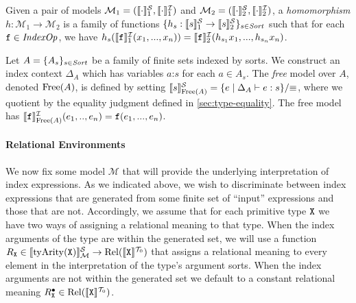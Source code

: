 Given a pair of models $\mathcal{M}_1 = (\llbracket \cdot \rrbracket^{\mathcal{S}}_1,
\llbracket \cdot \rrbracket^{\mathcal{I}}_1)$ and $\mathcal{M}_2 = (\llbracket \cdot \rrbracket^{\mathcal{S}}_2,
\llbracket \cdot \rrbracket^{\mathcal{I}}_2)$, a \emph{homomorphism} $h : \mathcal{M}_1 \to
\mathcal{M}_2$ is a family of functions $\{ h_s : \llbracket s \rrbracket^{\mathcal{S}}_1 \to
\llbracket s \rrbracket^{\mathcal{S}}_2 \}_{s \in \mathit{Sort}}$ such that for each $\texttt{f} \in
\mathit{IndexOp}$, we have $h_s(\llbracket \texttt{f} \rrbracket^{\mathcal{I}}_1 (x_1,...,x_n)) =
\llbracket \texttt{f} \rrbracket^{\mathcal{I}}_2(h_{s_1}x_1, ..., h_{s_n}x_n)$.

Let $A = \{ A_s \}_{s \in \mathit{Sort}}$ be a family of finite sets
indexed by sorts. We construct an index context $\Delta_A$ which has
variables $a\mathord:s$ for each $a \in A_s$. The \emph{free} model
over $A$, denoted $\mathrm{Free}(A)$, is defined by setting
$\llbracket s \rrbracket^{\mathcal{S}}_{\mathrm{Free}(A)} = \{e \mathrel| \Delta_A \vdash e :
s\}/\mathord\equiv$, where we quotient by the equality judgment
defined in \autoref{sec:type-equality}. The free model has
$\llbracket \texttt{f} \rrbracket^{\mathcal{I}}_{\mathrm{Free}(A)}(e_1,..,e_n) =
\texttt{f}(e_1,...,e_n)$.

\paragraph{Relational Environments} We now fix some model
$\mathcal{M}$ that will provide the underlying interpretation of index
expressions. As we indicated above, we wish to discriminate between
index expressions that are generated from some finite set of ``input''
expressions and those that are not. Accordingly, we assume that for
each primitive type $\textup{\texttt{X}}$ we have two ways of assigning a
relational meaning to that type. When the index arguments of the type
are within the generated set, we will use a function $R_{\textup{\texttt{X}}}
\in \llbracket \mathrm{tyArity}(\textup{\texttt{X}}) \rrbracket^{\mathcal{S}}_{\mathcal{M}} \to
\mathrm{Rel}(\llbracket \textup{\texttt{X}} \rrbracket^{\mathcal{T}_0})$ that assigns a relational meaning to
every element in the interpretation of the type's argument sorts. When
the index arguments are not within the generated set we default to a
constant relational meaning $R^\bullet_{\textup{\texttt{X}}} \in
\mathrm{Rel}(\llbracket \textup{\texttt{X}} \rrbracket^{\mathcal{T}_0})$.

